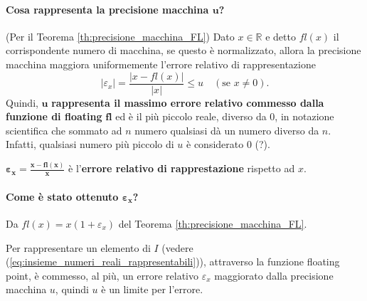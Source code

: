 \paragraph{Cosa rappresenta la precisione macchina $\boldsymbol{u}$?} (Per il Teorema \ref{th:precisione_macchina_FL}) Dato $x\in\mathbb R$ e detto $fl(x)$ il corrispondente numero di macchina, se questo è normalizzato, allora la precisione macchina \gls{maggiora uniformemente} l'errore relativo di rappresentazione
\begin{equation*}
	|\varepsilon_x| = \frac{|x-fl(x)|}{|x|}\leq u\quad (\text{se } x\neq 0).
\end{equation*}
Quindi, $\boldsymbol u$ \textbf{rappresenta il massimo errore relativo commesso dalla funzione di floating} $\boldsymbol{fl}$ ed è il più piccolo reale, diverso da 0, in notazione scientifica che sommato ad $n$ numero qualsiasi dà un numero diverso da $n$. Infatti, qualsiasi numero più piccolo di $u$ è considerato 0 (?).

\addtocounter{footnote}{-2}



\begin{definition}
	$\boldsymbol{\varepsilon_x}=\boldsymbol{\frac{x - fl(x)}{x}}$ è l'\textbf{errore relativo di rapprestazione} rispetto ad $x$.
\end{definition}
\paragraph{Come è stato ottenuto $\boldsymbol{\varepsilon_x}$?}{Da $fl(x)=x(1+\varepsilon_x)$ del Teorema \ref{th:precisione_macchina_FL}.}

Per rappresentare un elemento di $I$ (vedere (\ref{eq:insieme_numeri_reali_rappresentabili})), attraverso la funzione floating point, è commesso, al più, un errore relativo $\varepsilon_x$ maggiorato dalla precisione macchina $u$, quindi $u$ è un limite per l'errore.


